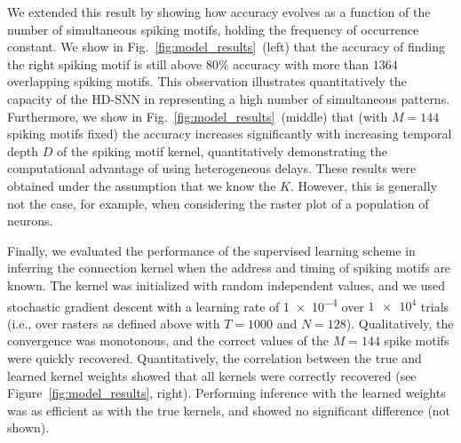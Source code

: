 \documentclass[runningheads]{llncs}
\newcommand{\kernel}{K} %
\newcommand{\fig}[1]{Fig.~\ref{fig:#1}}%
\begin{document}
We extended this result by showing how accuracy evolves as a function of the number of simultaneous spiking motifs, holding the frequency of occurrence constant. We show in \fig{model_results}~(left) that the accuracy of finding the right spiking motif is still above $80\%$ accuracy with more than $1364$ overlapping spiking motifs. This observation illustrates quantitatively the capacity  of the HD-SNN in representing a high number of simultaneous patterns. Furthermore, we show in \fig{model_results}~(middle) that (with $M=144$ spiking motifs fixed) the accuracy increases significantly with increasing temporal depth $D$ of the spiking motif kernel, quantitatively demonstrating the computational advantage of using heterogeneous delays. These results were obtained under the assumption that we know the $\kernel$. However, this is generally not the case, for example, when considering the raster plot of a population of neurons.

Finally, we evaluated the performance of the supervised learning scheme in inferring the connection kernel when the address and timing of spiking motifs are known. The kernel was initialized with random independent values, and we used stochastic gradient descent with a learning rate of \num{1e-4} over $\num{1e4}$ trials (i.e., over rasters as defined above with $T=1000$ and $N=128$). Qualitatively, the convergence was monotonous, and the correct values of the $M=144$ spike motifs were quickly recovered. Quantitatively, the correlation between the true and learned kernel weights showed that all kernels were correctly recovered (see Figure~\ref{fig:model_results}, right). Performing inference with the learned weights was as efficient as with the true kernels, and showed no significant difference (not shown).

\end{document}
